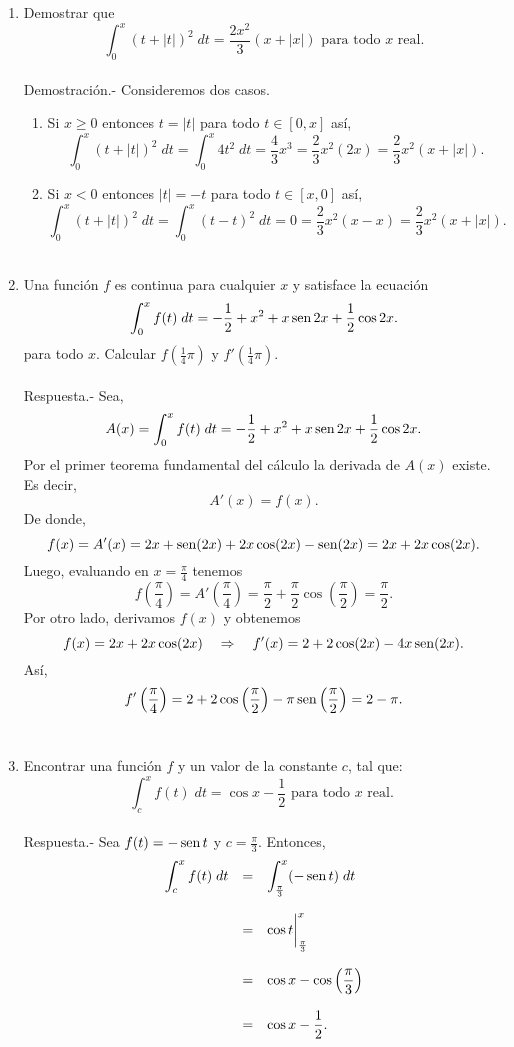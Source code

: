 \begin{enumerate}[\bfseries 1.]
    \item Demostrar que 
    $$\int_0^x \left(t+|t|\right)^2\; dt = \dfrac{2x^2}{3}(x+|x|) \mbox{ para todo } x \mbox{ real.}$$\\
    	Demostración.-\; Consideremos dos casos.
	\begin{enumerate}
	    \item Si $x\geq 0$ entonces $t=|t|$ para todo $t\in[0,x]$ así,
		$$\int_0^x (t+|t|)^2 \; dt= \int_0^x 4t^2\; dt = \dfrac{4}{3}x^3=\dfrac{2}{3}x^2(2x)=\dfrac{2}{3}x^2(x+|x|).$$
	    \item Si $x<0$ entonces $|t|=-t$ para todo $t\in[x,0]$ así,
		$$\int_0^x (t+|t|)^2 \; dt = \int_0^x (t-t)^2\; dt = 0 = \dfrac{2}{3}x^2(x-x)= \dfrac{2}{3}x^2(x+|x|).$$\\ 
	\end{enumerate}

    \item Una función $f$ es continua para cualquier $x$ y satisface la ecuación
    $$\int_0^x f(t)\; dt = -\dfrac{1}{2}+x^2+x\mathop{\mbox{\normalfont sen}}\nolimits2x + \dfrac{1}{2}\cos 2x.$$
    para todo $x$. Calcular $f\left(\frac{1}{4}\pi\right)$ y $f'\left(\frac{1}{4}\pi\right).$\\\\
	Respuesta.-\; Sea,
	$$A(x)=\int_0^x f(t)\; dt = -\dfrac{1}{2}+x^2+x\mathop{\mbox{\normalfont sen}}\nolimits2x + \dfrac{1}{2}\cos 2x.$$
	Por el primer teorema fundamental del cálculo la derivada de $A(x)$ existe. Es decir,
	$$A'(x)=f(x).$$
	De donde,
	$$f(x)=A'(x)=2x+\mathop{\mbox{\normalfont sen}}\nolimits(2x)+2x\cos(2x)-\mathop{\mbox{\normalfont sen}}\nolimits(2x)=2x+2x\cos(2x).$$
	Luego, evaluando en $x=\frac{\pi}{4}$ tenemos
	$$f\left(\dfrac{\pi}{4}\right)=A'\left(\dfrac{\pi}{4}\right)=\dfrac{\pi}{2}+\dfrac{\pi}{2}\cos\left(\dfrac{\pi}{2}\right)=\dfrac{\pi}{2}.$$
	Por otro lado, derivamos $f(x)$ y obtenemos
	$$f(x)=2x+2x\cos(2x)\quad \Rightarrow \quad f'(x)=2+2\cos(2x)-4x\mathop{\mbox{\normalfont sen}}\nolimits(2x).$$
	Así, 
	$$f'\left(\dfrac{\pi}{4}\right)=2+2\cos\left(\dfrac{\pi}{2}\right)-\pi\mathop{\mbox{\normalfont sen}}\nolimits\left(\dfrac{\pi}{2}\right)=2-\pi.$$\\

    \item Encontrar una función $f$ y un valor de la constante $c$, tal que:
    $$\int_c^x f(t)\; dt = \cos x - \dfrac{1}{2}\mbox{ para todo } x \mbox{ real. }$$\\
	Respuesta.-\; Sea $f(t)=-\mathop{\mbox{\normalfont sen}}\nolimits t$ y $c=\frac{\pi}{3}$. Entonces,
	$$\begin{array}{rcl}
	    \displaystyle\int_c^x f(t)\; dt &=& \displaystyle\int_{\frac{\pi}{3}}^x (-\mathop{\mbox{\normalfont sen}}\nolimits t)\; dt\\\\ 
					    &=&\cos t \bigg|_{\frac{\pi}{3}}^x\\\\
					    &=&\cos x - \cos \left(\dfrac{\pi}{3}\right)\\\\
					    &=&\cos x - \dfrac{1}{2}.
	\end{array}$$
	\vspace{0.5cm}


\end{enumerate}
